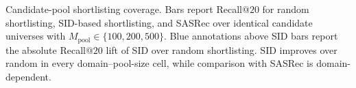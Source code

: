 \caption{Candidate-pool shortlisting coverage. Bars report Recall@$20$ for random
shortlisting, SID-based shortlisting, and SASRec over identical candidate
universes with $M_{\mathrm{pool}}\in\{100,200,500\}$. Blue annotations above
SID bars report the absolute Recall@$20$ lift of SID over random shortlisting.
SID improves over random in every domain--pool-size cell, while comparison with
SASRec is domain-dependent.}
\label{fig:shortlisting-coverage}
